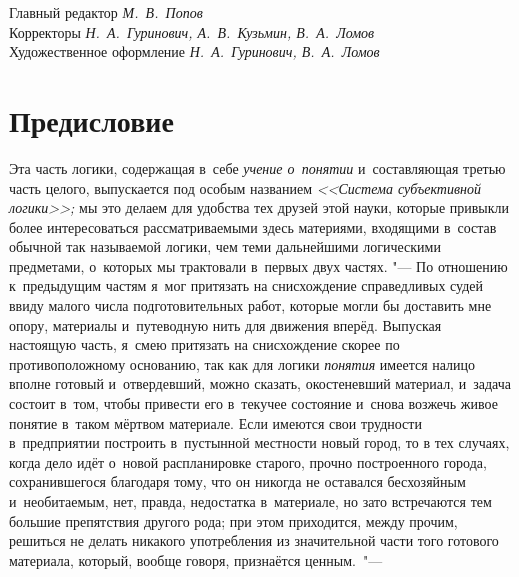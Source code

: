 Главный редактор {\em М.~В.~Попов} \\
Корректоры {\em Н.~А.~Гуринович, А.~В.~Кузьмин, В.~А.~Ломов} \\
Художественное оформление {\em Н.~А.~Гуринович, В.~А.~Ломов}

\bigskip
\clearpage

\chapter[Предисловие]{Предисловие}

Эта часть логики, содержащая в~себе {\em учение о~понятии} и~составляющая
третью часть целого, выпускается под особым названием {\em <<Система
субъективной логики>>;} мы это делаем для удобства тех друзей этой науки,
которые привыкли более интересоваться рассматриваемыми здесь материями,
входящими в~состав обычной так называемой логики, чем теми дальнейшими
логическими предметами, о~которых мы трактовали в~первых двух частях. "---
По отношению к~предыдущим частям я~мог притязать на снисхождение
справедливых судей ввиду малого числа подготовительных работ, которые могли
бы доставить мне опору, материалы и~путеводную нить для
движения вперёд. Выпуская настоящую часть, я~смею притязать на снисхождение
скорее по противоположному основанию, так как для логики {\em понятия} имеется
налицо вполне готовый и~отвердевший, можно сказать, окостеневший материал,
и~задача состоит в~том, чтобы привести его в~текучее состояние и~снова
возжечь живое понятие в~таком мёртвом материале. Если имеются свои
трудности в~предприятии построить в~пустынной местности новый город, то в
тех случаях, когда дело идёт о~новой распланировке старого, прочно
построенного города, сохранившегося благодаря тому, что он никогда не
оставался бесхозяйным и~необитаемым, нет, правда, недостатка в~материале,
но зато встречаются тем большие препятствия другого рода; при этом
приходится, между прочим, решиться не делать никакого употребления из
значительной части того готового материала, который, вообще говоря,
признаётся ценным.~"---

